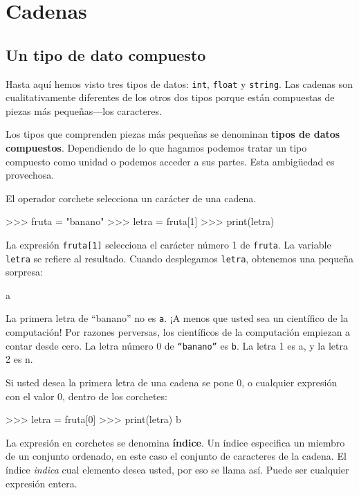 
\chapter{Cadenas }

\label{strings}

\section{Un tipo de dato compuesto}

 

Hasta aquí hemos visto tres tipos de datos: \texttt{int}, \texttt{float}
y \texttt{string}. Las cadenas son cualitativamente diferentes de
los otros dos tipos porque están compuestas de piezas más pequeñas—los
caracteres.


Los tipos que comprenden piezas más pequeñas se denominan \textbf{tipos
de datos compuestos}. Dependiendo de lo que hagamos podemos tratar
un tipo compuesto como unidad o podemos acceder a sus partes. Esta
ambigüedad es provechosa.

 

El operador corchete selecciona un carácter de una cadena.

\begin{pyconcode}
>>> fruta = "banano"
>>> letra = fruta[1]
>>> print(letra)	
\end{pyconcode}

La expresión \texttt{fruta{[}1{]}} selecciona el carácter número 1
de \texttt{fruta}. La variable \texttt{letra} se refiere al resultado.
Cuando desplegamos \texttt{letra}, obtenemos una pequeña sorpresa:
\begin{pythoncode}
a
\end{pythoncode}
La primera letra de ``banano'' no es \texttt{a}. ¡A menos que usted
sea un científico de la computación! Por razones perversas, los científicos
de la computación empiezan a contar desde cero. La letra número 0
de \texttt{``banano''} es \texttt{b}. La letra 1 es a, y la letra
2 es n.

Si usted desea la primera letra de una cadena se pone 0, o cualquier
expresión con el valor 0, dentro de los corchetes:
\begin{pyconcode}
>>> letra = fruta[0]
>>> print(letra)
b
\end{pyconcode}

La expresión en corchetes se denomina \textbf{índice}. Un índice especifica
un miembro de un conjunto ordenado, en este caso el conjunto de caracteres
de la cadena. El índice {\em indica} cual elemento desea usted,
por eso se llama así. Puede ser cualquier expresión entera.

